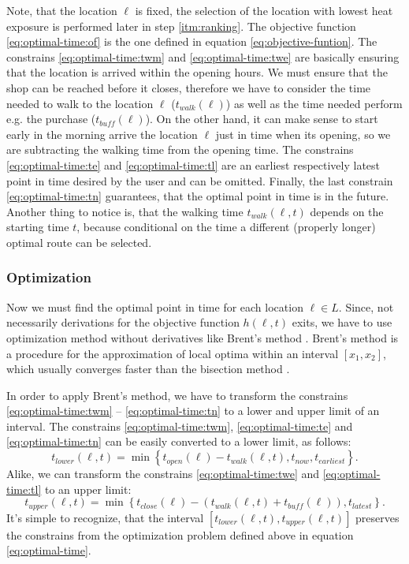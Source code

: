 Note, that the location $\ell$ is fixed, the selection of the location with lowest heat exposure is performed later in step \ref{itm:ranking}.  The objective function \eqref{eq:optimal-time:of} is the one defined in equation \eqref{eq:objective-funtion}. The constrains \eqref{eq:optimal-time:twm} and \eqref{eq:optimal-time:twe} are  basically ensuring that the location is arrived within the opening hours. We must ensure that the shop can be reached before it closes, therefore we have to consider the time needed to walk to the location $\ell$ ($t_{walk}(\ell)$) as well as the time needed perform e.g. the purchase ($t_{buff}(\ell)$). On the other hand, it can make sense to start early in the morning  arrive the location $\ell$ just in time when its opening, so we are subtracting the walking time from the opening time. The constrains \eqref{eq:optimal-time:te} and \eqref{eq:optimal-time:tl} are an earliest respectively latest point in time desired by the user and can be omitted. Finally, the last constrain  \eqref{eq:optimal-time:tn}  guarantees, that the optimal point in time is in the future. Another thing to notice is, that the walking time $t_{walk}(\ell, t)$ depends on the starting time $t$, because conditional on the time a different (properly longer) optimal route can be selected.

 \subsubsection{Optimization}
 
 Now we must find the optimal point in time for each location $\ell \in L$. Since, not necessarily derivations for the objective function $h(\ell, t)$ exits, we have to use optimization method without derivatives like Brent's method \parencite{Brent2002}. Brent's  method is a procedure for the approximation of local optima within an interval $[x_1, x_2]$, which usually converges faster than the bisection method \parencite{Press1992}.
 
 In order to apply Brent's method, we have to transform the constrains \eqref{eq:optimal-time:twm} -- \eqref{eq:optimal-time:tn} to a lower and upper limit of an interval.  The constrains \eqref{eq:optimal-time:twm}, \eqref{eq:optimal-time:te} and \eqref{eq:optimal-time:tn} can  be easily converted to a lower limit, as follows: 
  	\begin{equation}\label{eq:lower-limit}
  		t_{lower}(\ell, t) = \min\left\lbrace  t_{open}(\ell)-t_{walk}(\ell, t), t_{now}, t_{earliest} \right\rbrace.
  	\end{equation}
  Alike, we can transform the constrains \eqref{eq:optimal-time:twe} and \eqref{eq:optimal-time:tl} to an upper limit:
  	\begin{equation}\label{eq:upper-limit}
  		t_{upper}(\ell, t) = \min\left\lbrace  t_{close}(\ell)- (t_{walk}(\ell, t) + t_{buff}(\ell)), t_{latest} \right\rbrace.
  	\end{equation}
 It's simple to recognize, that the interval $[t_{lower}(\ell, t), t_{upper}(\ell, t)]$ preserves the constrains from the optimization problem defined above in equation \eqref{eq:optimal-time}.  
 

